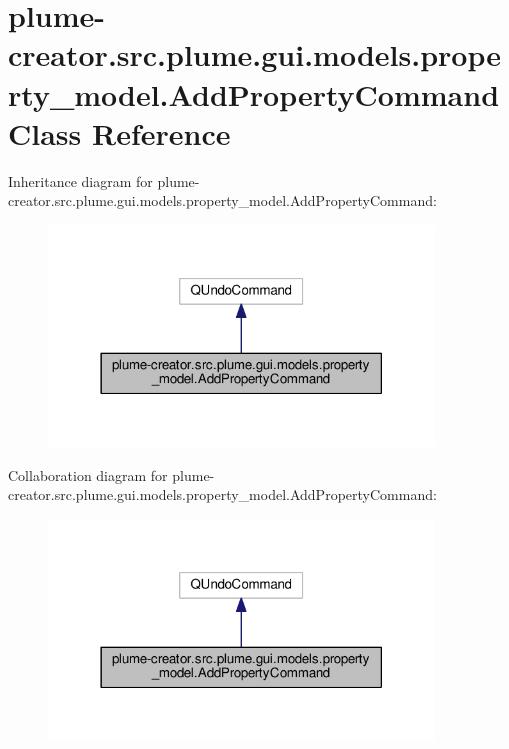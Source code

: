 \hypertarget{classplume-creator_1_1src_1_1plume_1_1gui_1_1models_1_1property__model_1_1_add_property_command}{}\section{plume-\/creator.src.\+plume.\+gui.\+models.\+property\+\_\+model.\+Add\+Property\+Command Class Reference}
\label{classplume-creator_1_1src_1_1plume_1_1gui_1_1models_1_1property__model_1_1_add_property_command}


Inheritance diagram for plume-\/creator.src.\+plume.\+gui.\+models.\+property\+\_\+model.\+Add\+Property\+Command\+:\nopagebreak
\begin{figure}[H]
\begin{center}
\leavevmode
\includegraphics[width=290pt]{classplume-creator_1_1src_1_1plume_1_1gui_1_1models_1_1property__model_1_1_add_property_command__inherit__graph}
\end{center}
\end{figure}


Collaboration diagram for plume-\/creator.src.\+plume.\+gui.\+models.\+property\+\_\+model.\+Add\+Property\+Command\+:\nopagebreak
\begin{figure}[H]
\begin{center}
\leavevmode
\includegraphics[width=290pt]{classplume-creator_1_1src_1_1plume_1_1gui_1_1models_1_1property__model_1_1_add_property_command__coll__graph}
\end{center}
\end{figure}
